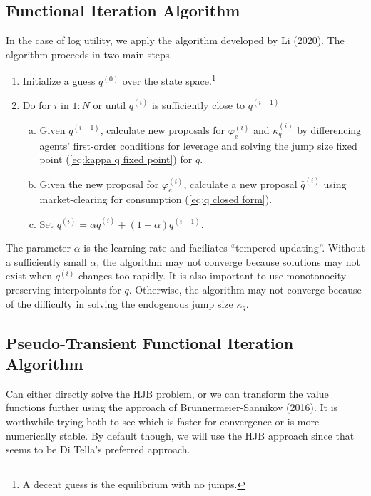 \documentclass[12 pt, oneside]{article}
\theoremstyle{definition}
\theoremstyle{definition}
\theoremstyle{definition}
\begin{document}
\subsection{Functional Iteration Algorithm}
In the case of log utility, we apply the algorithm developed by Li (2020). The algorithm proceeds in two main steps.
\begin{enumerate}
\item Initialize a guess $q^{(0)}$ over the state space.\footnote{A decent guess is the equilibrium with no jumps.}
\item Do for $i$ in $1:N$ or until $q^{(i)}$ is sufficiently close to $q^{(i - 1)}$
  \begin{enumerate}[(a)]
  \item Given $q^{(i - 1)}$, calculate new proposals for $\varphi_e^{(i)}$ and $\kappa_q^{(i)}$ by differencing agents' first-order conditions for leverage and solving the jump size fixed point (\ref{eq:kappa q fixed point}) for $q$.
  \item Given the new proposal for $\varphi_e^{(i)}$, calculate a new proposal $\hat{q}^{(i)}$ using market-clearing for consumption (\ref{eq:q closed form}).
  \item Set $q^{(i)} = \alpha \hat{q}^{(i)} + (1 - \alpha) q^{(i - 1)}$.
  \end{enumerate}
\end{enumerate}
The parameter $\alpha$ is the learning rate and faciliates ``tempered updating''. Without a sufficiently small $\alpha$, the algorithm may not converge because solutions may not exist when $q^{(i)}$ changes too rapidly. It is also important to use monotonocity-preserving interpolants for $q$. Otherwise, the algorithm may not converge because of the difficulty in solving the endogenous jump size $\kappa_q$.





\subsection{Pseudo-Transient Functional Iteration Algorithm}



Can either directly solve the HJB problem, or we can transform the value functions further using the approach of Brunnermeier-Sannikov (2016). It is worthwhile trying both to see which is faster for convergence or is more numerically stable. By default though, we will use the HJB approach since that seems to be Di Tella's preferred approach.
\end{document}
